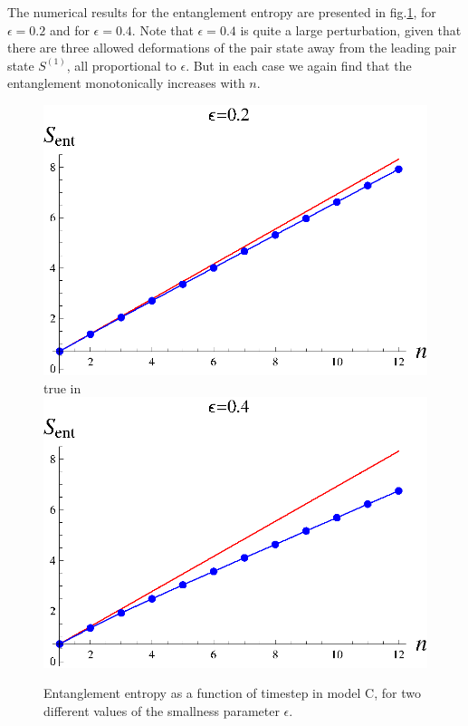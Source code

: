 \documentclass[12pt]{article}
\begin{document}
The numerical results for the entanglement entropy are presented in fig.\ref{fn6m}, for $\epsilon=0.2$ and for $\epsilon=0.4$. Note that $\epsilon=0.4$ is quite a large perturbation, given that there are three allowed deformations of the pair state away from the leading pair state $S^{(1)}$, all proportional to $\epsilon$. But in each case we again find that the entanglement monotonically increases with $n$.

\begin{figure}[htbp]
\begin{center}
\includegraphics[scale=.58]{modelc2.eps} true in
\includegraphics[scale=.58]{modelc4.eps}
\caption{{Entanglement entropy as a function of timestep in model C, for  two different values of the smallness parameter $\epsilon$.}}
\label{fn6m}
\end{center}
\end{figure}
\end{document}
